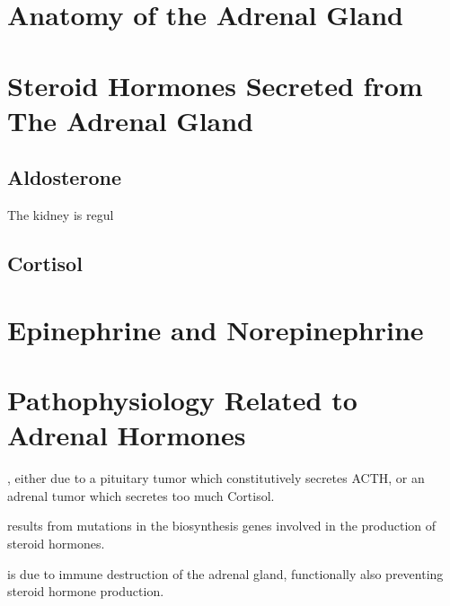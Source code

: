 \documentclass{tufte-handout}
\begin{document}
\section{Anatomy of the Adrenal Gland}

\section{Steroid Hormones Secreted from The Adrenal Gland}

\subsection{Aldosterone}

 The kidney is regul

\subsection{Cortisol}

\section{Epinephrine and Norepinephrine}

\section{Pathophysiology Related to Adrenal Hormones}

, either due to a pituitary tumor which constitutively secretes ACTH, or an adrenal tumor which secretes too much Cortisol.

 results from mutations in the biosynthesis genes involved in the production of steroid hormones.

 is due to immune destruction of the adrenal gland, functionally also preventing steroid hormone production.

\listoffigures
\listoftables



\end{document}
